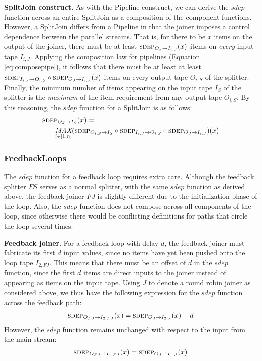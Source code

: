 {\bf SplitJoin construct.}  As with the Pipeline construct, we can
derive the $sdep$ function across an entire SplitJoin as a composition
of the component functions.  However, a SplitJoin differs from a
Pipeline in that the joiner imposes a control dependence between the
parallel streams.  That is, for there to be $x$ items on the output of
the joiner, there must be at least $\mi{I_{i,J}}{O_J}(x)$ items on {\it
every} input tape $I_{i,J}$.  Applying the composition law for pipelines
(Equation \ref{eq:composepipe}), it follows that there must be at
least at least $\mi{O_{i,S}}{I_{i,J}} \circ \mi{I_{i,J}}{O_J}(x)$ items on
every output tape $O_{i,S}$ of the splitter.  Finally, the minimum number
of items appearing on the input tape $I_S$ of the splitter is the {\it
maximum} of the item requirement from any output tape $O_{i,S}$.  By this
reasoning, the $sdep$ function for a SplitJoin is as follows:
\begin{align*}
&\mi{I_S}{O_J}(x) = \\ &~~~~~\fn{MAX}_{i \in [1,n]}(\mi{I_S}{O_{i,S}} \circ
\mi{O_{i,S}}{I_{i,J}} \circ \mi{I_{i,J}}{O_J})(x)
\end{align*}

\subsubsection{FeedbackLoops}
\label{sec:timefl}

The $sdep$ function for a feedback loop requires extra care. Although
the feedback splitter $FS$ serves as a normal splitter, with the same
$sdep$ function as derived above, the feedback joiner $FJ$ is slightly
different due to the initialization phase of the loop.  Also, the
$sdep$ function does not compose across all components of the loop,
since otherwise there would be conflicting definitions for paths that
circle the loop several times.

{\bf Feedback joiner}.  For a feedback loop with delay $d$, the
feedback joiner must fabricate its first $d$ input values, since no
items have yet been pushed onto the loop tape $I_{2,FJ}$.  This means
that there must be an offset of $d$ in the $sdep$ function, since the
first $d$ items are direct inputs to the joiner instead of appearing
as items on the input tape.  Using $J$ to denote a round robin joiner
as considered above, we thus have the following expression for the
$sdep$ function across the feedback path:
\begin{align*}
\mi{I_{2,FJ}}{O_{FJ}}(x) = \mi{I_{2,J}}{O_J}(x) - d
\end{align*}
However, the $sdep$ function remains unchanged with respect to the
input from the main stream:
\begin{align*}
\mi{I_{1,FJ}}{O_{FJ}}(x) = \mi{I_{1,J}}{O_J}(x)
\end{align*}

